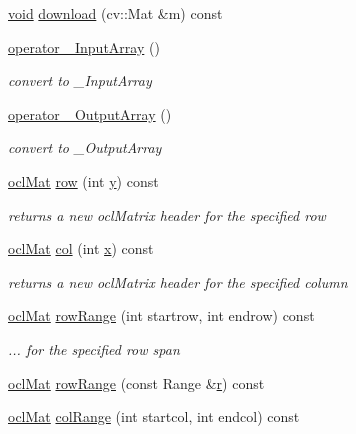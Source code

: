 \begin{DoxyCompactItemize}
\hyperlink{legacy_8hpp_a8bb47f092d473522721002c86c13b94e}{void} \hyperlink{classcv_1_1ocl_1_1oclMat_aa3289945ebb9580cec3c980965d09adc}{download} (cv\-::\-Mat \&m) const 
\item 
\hyperlink{classcv_1_1ocl_1_1oclMat_a63f34ef7e3435940638f6dcc7b54f802}{operator \-\_\-\-Input\-Array} ()
\begin{DoxyCompactList}\small\item\em convert to \-\_\-\-Input\-Array \end{DoxyCompactList}\item 
\hyperlink{classcv_1_1ocl_1_1oclMat_ac06c4e759a7c4f97ccb8e55ee2e5db24}{operator \-\_\-\-Output\-Array} ()
\begin{DoxyCompactList}\small\item\em convert to \-\_\-\-Output\-Array \end{DoxyCompactList}\item 
\hyperlink{classcv_1_1ocl_1_1oclMat}{ocl\-Mat} \hyperlink{classcv_1_1ocl_1_1oclMat_a5e927c1ab9729772df69829e29467fd7}{row} (int \hyperlink{highgui__c_8h_af1202c02b14870c18fb3a1da73e9e7c7}{y}) const 
\begin{DoxyCompactList}\small\item\em returns a new ocl\-Matrix header for the specified row \end{DoxyCompactList}\item 
\hyperlink{classcv_1_1ocl_1_1oclMat}{ocl\-Mat} \hyperlink{classcv_1_1ocl_1_1oclMat_a761d9493dc8d989b0bec105e832e8fb6}{col} (int \hyperlink{highgui__c_8h_a6150e0515f7202e2fb518f7206ed97dc}{x}) const 
\begin{DoxyCompactList}\small\item\em returns a new ocl\-Matrix header for the specified column \end{DoxyCompactList}\item 
\hyperlink{classcv_1_1ocl_1_1oclMat}{ocl\-Mat} \hyperlink{classcv_1_1ocl_1_1oclMat_a60bd94d8a6110a2e50bf9fbcfc2db0d2}{row\-Range} (int startrow, int endrow) const 
\begin{DoxyCompactList}\small\item\em ... for the specified row span \end{DoxyCompactList}\item 
\hyperlink{classcv_1_1ocl_1_1oclMat}{ocl\-Mat} \hyperlink{classcv_1_1ocl_1_1oclMat_ad03275f533e77035425a08ed6510db0b}{row\-Range} (const Range \&\hyperlink{core__c_8h_a54709f3b06b33b66763f1613cc7fb571}{r}) const 
\item 
\hyperlink{classcv_1_1ocl_1_1oclMat}{ocl\-Mat} \hyperlink{classcv_1_1ocl_1_1oclMat_a8d61c3d2a4c840c9f785ea1e319e1981}{col\-Range} (int startcol, int endcol) const 

\end{DoxyCompactItemize}
